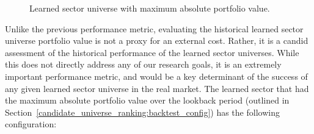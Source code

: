 \documentclass[../main.tex]{subfiles}
\begin{document}
\begin{figure}
    \centering
    \caption{Learned sector universe with maximum absolute portfolio value.}
    \label{fig:optimal_sector_universe:max_return}
\end{figure}

Unlike the previous performance metric, evaluating the historical learned sector universe portfolio value is not a proxy for an external cost. Rather, it is a candid assessment of the historical performance of the learned sector universes. While this does not directly address any of our research goals, it is an extremely important performance metric, and would be a key determinant of the success of any given learned sector universe in the real market. The learned sector that had the maximum absolute portfolio value over the lookback period (outlined in Section~\ref{candidate_universe_ranking:backtest_config}) has the following configuration:

\vspace{.5em}

\begin{minipage}{\linewidth}
    \centering
    \bfseries
\end{minipage}

\vspace{.5em}
\end{document}
